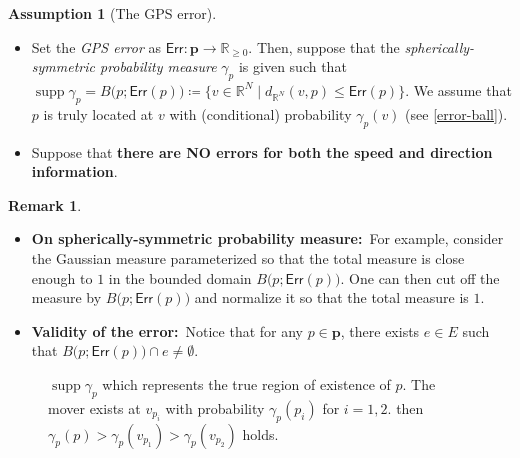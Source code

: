 \documentclass{article}
\numberwithin{equation}{section}
\theoremstyle{definition}
\newtheorem{remark}[remark]{Remark}
\newtheorem{assumption}[assumption]{Assumption}
\newcommand{\err}{\mathsf{Err}}
\newcommand{\R}{\mathbb{R}}
\DeclareMathOperator\supp{supp} %
\def\:={\coloneqq} %
\begin{document}
\begin{assumption}[The GPS error] \label{GPS error}
$ $\newline
\begin{itemize} \vspace{-6mm}
\item Set the \emph{GPS error} as $\err:\mathbf{p}\to\R_{\ge0}$.
Then, suppose that the \emph{spherically-symmetric probability measure} $\gamma_p$ is given such that $\supp\gamma_p=B\big(p;\err(p)\big)\:=\big\{v\in\R^N\;\big|\;d_{\R^N}(v,p)\leq\err(p)\big\}$.
We assume that $p$ is truly located at $v$ with (conditional) probability $\gamma_p(v)$ (see \autoref{error-ball}). \vspace{-2mm}
\item Suppose that \textbf{there are NO errors for both the speed and direction information}.
\end{itemize}
\end{assumption}

\begin{remark} \label{GPS p.m.}
$ $\newline
\begin{itemize} \vspace{-6mm}
\item \textbf{On spherically-symmetric probability measure:}\,
For example, consider the Gaussian measure parameterized so that the total measure is close enough to $1$ in the bounded domain $B\big(p;\err(p)\big)$.
One can then cut off the measure by $B\big(p;\err(p)\big)$ and normalize it so that the total measure is $1$. \vspace{-2mm}
\item \textbf{Validity of the error:}\,
Notice that for any $p\in\mathbf{p}$, there exists $e\in E$ such that $B\big(p;\err(p)\big)\cap e\neq\emptyset$.
\end{itemize}
\end{remark}

\begin{figure}[H]
\begin{center}
\caption{$\supp\gamma_p$ which represents the true region of existence of $p$.
The mover exists at $v_{p_i}$ with probability $\gamma_p(p_i)$ for $i=1,2$.
then $\gamma_p(p)>\gamma_p(v_{p_1})>\gamma_p(v_{p_2})$ holds.} \label{error-ball}
\end{center}
\end{figure}
\end{document}
